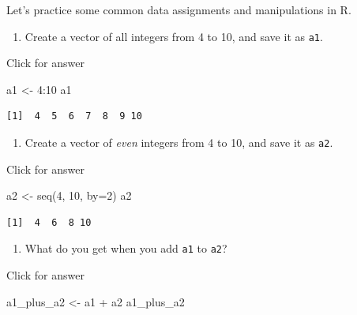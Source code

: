 \documentclass[
]{book}
\newenvironment{Shaded}{\begin{snugshade}}{\end{snugshade}}
\newcommand{\AttributeTok}[1]{\textcolor[rgb]{0.77,0.63,0.00}{#1}}
\newcommand{\DecValTok}[1]{\textcolor[rgb]{0.00,0.00,0.81}{#1}}
\newcommand{\FunctionTok}[1]{\textcolor[rgb]{0.00,0.00,0.00}{#1}}
\newcommand{\NormalTok}[1]{#1}
\newcommand{\OtherTok}[1]{\textcolor[rgb]{0.56,0.35,0.01}{#1}}
\newcommand{\SpecialCharTok}[1]{\textcolor[rgb]{0.00,0.00,0.00}{#1}}
\providecommand{\tightlist}{%
  \setlength{\itemsep}{0pt}\setlength{\parskip}{0pt}}
\begin{document}
Let's practice some common data assignments and manipulations in R.

\begin{enumerate}
\def\labelenumi{\alph{enumi}.}
\tightlist
\item
  Create a vector of all integers from 4 to 10, and save it as \texttt{a1}.
\end{enumerate}

Click for answer

\begin{Shaded}
\begin{Highlighting}[]
\NormalTok{a1 }\OtherTok{\textless{}{-}} \DecValTok{4}\SpecialCharTok{:}\DecValTok{10}
\NormalTok{a1}
\end{Highlighting}
\end{Shaded}

\begin{verbatim}
[1]  4  5  6  7  8  9 10
\end{verbatim}

\begin{enumerate}
\def\labelenumi{\alph{enumi}.}
\setcounter{enumi}{1}
\tightlist
\item
  Create a vector of \emph{even} integers from 4 to 10, and save it as \texttt{a2}.
\end{enumerate}

Click for answer

\begin{Shaded}
\begin{Highlighting}[]
\NormalTok{a2 }\OtherTok{\textless{}{-}} \FunctionTok{seq}\NormalTok{(}\DecValTok{4}\NormalTok{, }\DecValTok{10}\NormalTok{, }\AttributeTok{by=}\DecValTok{2}\NormalTok{)}
\NormalTok{a2}
\end{Highlighting}
\end{Shaded}

\begin{verbatim}
[1]  4  6  8 10
\end{verbatim}

\begin{enumerate}
\def\labelenumi{\alph{enumi}.}
\setcounter{enumi}{2}
\tightlist
\item
  What do you get when you add \texttt{a1} to \texttt{a2}?
\end{enumerate}

Click for answer

\begin{Shaded}
\begin{Highlighting}[]
\NormalTok{a1\_plus\_a2 }\OtherTok{\textless{}{-}}\NormalTok{ a1 }\SpecialCharTok{+}\NormalTok{ a2}
\NormalTok{a1\_plus\_a2}
\end{Highlighting}
\end{Shaded}
\end{document}
